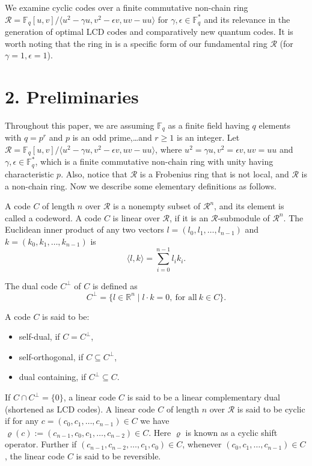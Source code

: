 \documentclass[12pt]{article}
\begin{document}
We examine cyclic codes over a finite commutative non-chain ring $\mathcal{R} = \mathbb{F}_q[u,v]/\langle u^2 - \gamma u, v^2 - \epsilon v, uv - uu \rangle$ for $\gamma, \epsilon \in \mathbb{F}_q^*$ and its relevance in the generation of optimal LCD codes and comparatively new quantum codes. It is worth noting that the ring in \cite{21} is a specific form of our fundamental ring $\mathcal{R}$ (for $\gamma = 1, \epsilon = 1$).

\section*{2. Preliminaries}
Throughout this paper, we are assuming $\mathbb{F}_q$ as a finite field having $q$ elements with $q = p^r$ and $p$ is an odd prime,\ldots  and $r \geq 1$ is an integer. Let $\mathcal{R} = \mathbb{F}_q[u,v]/\langle u^2 - \gamma u, v^2 - \epsilon v, uv - uu \rangle$, where $u^2 = \gamma u, v^2 = \epsilon v, uv = uu$ and $\gamma, \epsilon \in \mathbb{F}_q^*$, which is a finite commutative non-chain ring with unity having characteristic $p$. Also, notice that $\mathcal{R}$ is a Frobenius ring that is not local, and $\mathcal{R}$ is a non-chain ring. Now we describe some elementary definitions as follows.

A code $C$ of length $n$ over $\mathcal{R}$ is a nonempty subset of $\mathcal{R}^n$, and its element is called a codeword. A code $C$ is linear over $\mathcal{R}$, if it is an $\mathcal{R}$-submodule of $\mathcal{R}^n$. The Euclidean inner product of any two vectors $l = (l_0, l_1, \ldots, l_{n-1})$ and $k = (k_0, k_1, \ldots, k_{n-1})$ is
\begin{equation}
\langle l, k \rangle = \sum_{i=0}^{n-1} l_i k_i.
\end{equation}


The dual code $C^{\perp}$ of $C$ is defined as
\[
C^{\perp} = \{ l \in \mathbb{R}^n \mid l \cdot k = 0, \ \text{for all} \ k \in C \}.
\]

A code $C$ is said to be:
\begin{itemize}
    \item self-dual, if $C = C^{\perp}$,
    \item self-orthogonal, if $C \subseteq C^{\perp}$,
    \item dual containing, if $C^{\perp} \subseteq C$.
\end{itemize}

If $C \cap C^{\perp} = \{0\}$, a linear code $C$ is said to be a linear complementary dual (shortened as LCD codes). A linear code $C$ of length $n$ over $\mathcal{R}$ is said to be cyclic if for any $c = (c_0, c_1, \ldots, c_{n-1}) \in C$ we have $\varrho(c) := (c_{n-1}, c_0, c_1, \ldots, c_{n-2}) \in C$. Here $\varrho$ is known as a cyclic shift operator. Further if $(c_{n-1}, c_{n-2}, \ldots, c_1, c_0) \in C$, whenever $(c_0, c_1, \ldots, c_{n-1}) \in C$, the linear code $C$ is said to be reversible.
\end{document}
